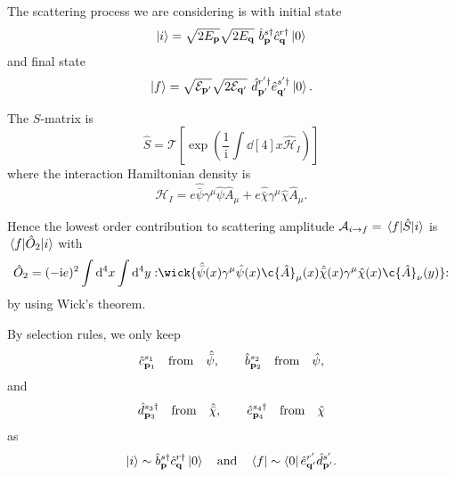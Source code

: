 \documentclass[a4paper,11pt]{article}
\begin{document}
	The scattering process we are considering is 
	with initial state
	\[
		\ket{i} = \sqrt{2 E _{\vb p}} \sqrt{2 E _{\vb q}}\  \hat b^{s\dagger}_{\vb p} \hat c^{r\dagger}_{\vb q} \ket{0}
	\]
	and final state
	\[
		\ket{f} = \sqrt{\mathcal{E}_{\vb p'}} \sqrt{2 \mathcal{E}_{\vb q'}}\ \hat d^{r'\dagger}_{\vb p'} \hat e^{s'\dagger}_{\vb q'} \ket{0}.
	\]
	
	The $S$-matrix is
	\[
		\hat S = \mathcal{T}\left[ \exp(\frac{1}{\mathrm{i}} \int \dd[4]{x} \hat {\mathcal{H}}_I) \right]
	\]
	where the interaction Hamiltonian density is
	\[
		\hat{\mathcal{H}}_I = e \hat{\bar \psi} \gamma^\mu \hat \psi \hat A_\mu + e \hat{\bar \chi} \gamma^\mu \hat \chi \hat A_\mu.
	\]
	
	Hence the lowest order contribution to scattering amplitude $\mathcal{A}_{i \to f} = \mel{f}{\hat S}{i}$ is
	$\mel{f}{\hat O_2}{i}$ with
	\[
		\hat O_2 = (-\mathrm{i} e)^2 \int \dd[4]{x} \int \dd[4]{y} \nord{\wick{\hat{\bar \psi}(x) \gamma^\mu \hat \psi(x) \c{\hat A}_\mu(x) \hat{\bar \chi}(x)\gamma^\mu \hat \chi(x) \c{\hat A}_\nu(y)}}
	\]
	by using Wick's theorem. 

	By selection rules, we only keep 
	\[
		\hat c ^{s_1}_{\vb p_1} \quad \text{from} \quad \hat{\bar \psi}, \qquad \hat b ^{s_2}_{\vb p_2} \quad \text{from} \quad \hat \psi,
	\]
	and
	\[
		\hat d ^{s_3\dagger}_{\vb p_3} \quad \text{from} \quad \hat{\bar \chi}, \qquad \hat e ^{s_4\dagger}_{\vb p_4} \quad \text{from} \quad \hat \chi
	\]
	as 
	\[
		\ket{i} \sim \hat b^{s\dagger}_{\vb p} \hat c^{r\dagger}_{\vb q} \ket{0} \quad \text{and} \quad \bra{f} \sim \bra{0} \hat e ^{r'}_{\vb q'} \hat d ^{s'}_{\vb p'}.
	\]
	
\end{document}
